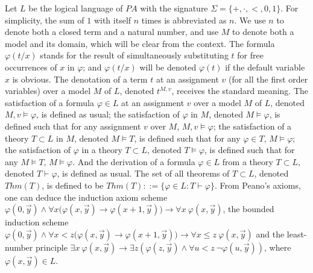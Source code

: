 \documentclass[a4paper,11pt]{article}
\begin{document}
Let $L$ be the logical language of $PA$ with the signature $\Sigma = \{ +,\cdot,<,0,1 \}$. For simplicity, the sum of $1$ with itself $n$ times is abbreviated as $n$. We use $n$ to denote both a closed term and a natural number, and use $M$ to denote both a model and its domain, which will be clear from the context. The formula $\varphi(t/x)$ stands for the result of simultaneously substituting $t$ for free occurrences of $x$ in $\varphi$; and $\varphi(t/x)$ will be denoted $\varphi(t)$ if the default variable $x$ is obvious. The denotation of a term $t$ at an assignment $v$ (for all the first order variables) over a model $M$ of $L$, denoted $t^{M,v}$, receives the standard meaning. The satisfaction of a formula $\varphi\in L$ at an assignment $v$ over a model $M$ of $L$, denoted $M,v \models \varphi$, is defined as usual; the satisfaction of $\varphi$ in $M$, denoted $M\models \varphi$, is defined such that for any assignment $v$ over $M$, $M,v\models \varphi$; the satisfaction of a theory $T\subset L$ in $M$, denoted $M\models T$, is defined such that for any $\varphi\in T$, $M\models \varphi$; the satisfaction of $\varphi$ in a theory $T\subset L$, denoted $T\models \varphi$, is defined such that for any $M\models T$, $M\models \varphi$. And the derivation of a formula $\varphi\in L$ from a theory $T\subset L$, denoted $T\vdash \varphi$, is defined as usual. The set of all theorems of $T\subset L$, denoted $Thm(T)$, is defined to be $Thm(T) ::= \{\varphi \in L : T \vdash \varphi \}$. From Peano's axioms, one can deduce the induction axiom scheme $\varphi(0,\vec{y})\wedge \forall x\big(\varphi(x,\vec{y})\rightarrow \varphi(x+1,\vec{y})\big)\rightarrow \forall x\ \varphi(x,\vec{y})$, the bounded induction scheme $\varphi(0,\vec{y})\wedge \forall x<z \big(\varphi(x,\vec{y})\rightarrow \varphi(x+1,\vec{y})\big)\rightarrow \forall x\leq z\ \varphi(x,\vec{y})$ and the least-number principle $\exists x\ \varphi(x,\vec{y})\rightarrow \exists z ( \varphi(z,\vec{y})\wedge \forall u<z\ \neg \varphi(u,\vec{y}) )$, where $\varphi(x,\vec{y}) \in L$.
\end{document}
